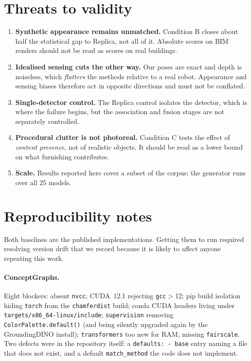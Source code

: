 \documentclass[11pt,a4paper]{article}
\begin{document}
\section{Threats to validity}

\begin{enumerate}
\item \textbf{Synthetic appearance remains unmatched.} Condition B closes about
half the statistical gap to Replica, not all of it. Absolute scores on BIM
renders should not be read as scores on real buildings.
\item \textbf{Idealised sensing cuts the other way.} Our poses are exact and
depth is noiseless, which \emph{flatters} the methods relative to a real robot.
Appearance and sensing biases therefore act in opposite directions and must not
be conflated.
\item \textbf{Single-detector control.} The Replica control isolates the
detector, which is where the failure begins, but the association and fusion
stages are not separately controlled.
\item \textbf{Procedural clutter is not photoreal.} Condition C tests the effect
of \emph{content presence}, not of realistic objects. It should be read as a
lower bound on what furnishing contributes.
\item \textbf{Scale.} Results reported here cover a subset of the corpus; the
generator runs over all 25 models.
\end{enumerate}

\section{Reproducibility notes}

Both baselines are the published implementations. Getting them to run required
resolving version drift that we record because it is likely to affect anyone
repeating this work.

\paragraph{ConceptGraphs.} Eight blockers: absent \texttt{nvcc}; CUDA~12.1
rejecting \texttt{gcc}$>$12; pip build isolation hiding \texttt{torch} from the
\texttt{chamferdist} build; conda CUDA headers living under
\texttt{targets/x86\_64-linux/include}; \texttt{supervision} removing
\texttt{ColorPalette.default()} (and being silently upgraded again by the
GroundingDINO install); \texttt{transformers} too new for RAM; missing
\texttt{fairscale}. Two defects were in the repository itself: a
\texttt{defaults:\ -\ base} entry naming a file that does not exist, and a
default \texttt{match\_method} the code does not implement.
\end{document}
